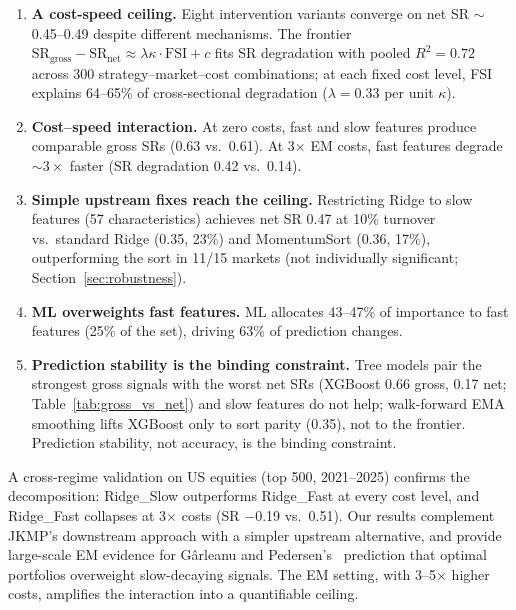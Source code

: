 \documentclass[sigconf,review,anonymous,balance=false]{acmart}
\begin{document}
\begin{enumerate}
    \item \textbf{A cost-speed ceiling.} Eight intervention variants
    converge on net SR ${\sim}$0.45--0.49 despite different mechanisms.
    The frontier $\text{SR}_{\text{gross}} - \text{SR}_{\text{net}}
    \approx \lambda\kappa \cdot \text{FSI} + c$ fits SR degradation
    with pooled $R^2 = 0.72$ across 300 strategy--market--cost
    combinations; at each fixed cost level, FSI explains 64--65\% of
    cross-sectional degradation ($\lambda = 0.33$ per unit $\kappa$).

    \item \textbf{Cost--speed interaction.} At zero costs, fast and slow
    features produce comparable gross SRs (0.63 vs.\ 0.61). At
    3$\times$ EM costs, fast features degrade ${\sim}3\times$ faster
    (SR degradation 0.42 vs.\ 0.14).

    \item \textbf{Simple upstream fixes reach the ceiling.} Restricting
    Ridge to slow features (57 characteristics) achieves net SR 0.47
    at 10\% turnover vs.\ standard Ridge (0.35, 23\%) and MomentumSort
    (0.36, 17\%), outperforming the sort in 11/15 markets (not
    individually significant; Section~\ref{sec:robustness}).

    \item \textbf{ML overweights fast features.} ML allocates
    43--47\% of importance to fast features (25\% of the set),
    driving 63\% of prediction changes.

    \item \textbf{Prediction stability is the binding constraint.}
    Tree models pair the strongest gross signals with the worst net
    SRs (XGBoost 0.66 gross, 0.17 net; Table~\ref{tab:gross_vs_net})
    and slow features do not help; walk-forward EMA smoothing lifts
    XGBoost only to sort parity (0.35), not to the frontier.
    Prediction stability, not accuracy, is the binding constraint.
\end{enumerate}

A cross-regime validation on US equities (top 500, 2021--2025) confirms
the decomposition: Ridge\_Slow outperforms Ridge\_Fast at every cost
level, and Ridge\_Fast collapses at 3$\times$ costs (SR $-$0.19 vs.\
0.51). Our results complement JKMP's downstream approach with a simpler
upstream alternative, and provide large-scale EM evidence for
G\^{a}rleanu and Pedersen's~\cite{garleanu2013dynamic} prediction that
optimal portfolios overweight slow-decaying signals. The EM setting,
with 3--5$\times$ higher costs, amplifies the interaction into a
quantifiable ceiling.
\end{document}
